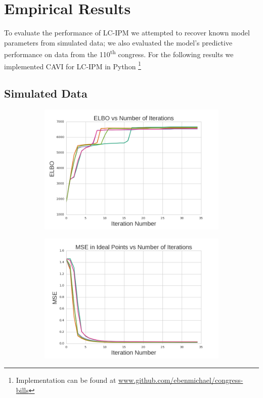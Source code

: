 \documentclass{article}
\begin{document}
\newpage

\section{Empirical Results}
\label{results}
To evaluate the performance of LC-IPM we attempted to recover known model parameters from simulated data; we also evaluated the model's predictive performance on data from the 110\textsuperscript{th} congress. For the following results we implemented CAVI for LC-IPM in Python \footnote{Implementation can be found at \url{www.github.com/ebenmichael/congress-bills}}
\subsection{Simulated Data}
\begin{figure}[h]
  \centering
    \begin{subfigure}[b]{0.3\textwidth}
        \includegraphics[width=\textwidth]{toy_elbos.png}
        \caption{}
    \end{subfigure}
          \begin{subfigure}[b]{0.3\textwidth}
        \includegraphics[width=\textwidth]{toy_ip_mse.png}

\end{subfigure}
\end{figure}
\end{document}
